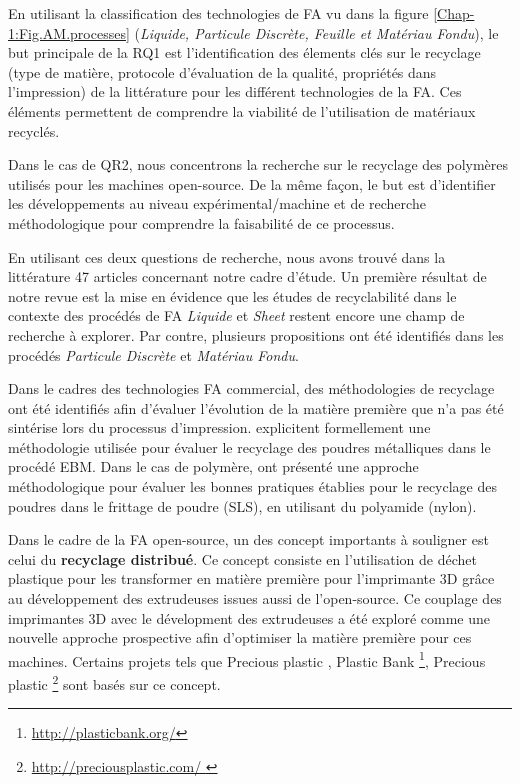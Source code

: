 En utilisant la classification des technologies de FA vu dans la figure \ref{Chap-1:Fig.AM.processes} (\textit{Liquide, Particule Discrète, Feuille et Matériau Fondu}), 
le but principale de la RQ1 est l'identification des élements clés sur le recyclage (type de matière, protocole d'évaluation de la qualité, propriétés dans l'impression) de la littérature pour les différent technologies de la FA.		
Ces éléments permettent de comprendre la viabilité de l'utilisation de matériaux recyclés.

Dans le cas de QR2, nous  concentrons  la recherche sur le recyclage des polymères utilisés pour les machines open-source.
De la même façon, le but est d'identifier les développements au niveau expérimental/machine et de recherche méthodologique pour comprendre la faisabilité de ce processus.


En utilisant ces deux questions de recherche,  nous avons trouvé dans la littérature 47 articles concernant notre cadre d'étude.
Un première résultat de notre revue est la mise en évidence que les études de recyclabilité dans le contexte des procédés de FA \textit{Liquide} et \textit{Sheet} restent encore une champ de recherche à explorer.
Par contre, plusieurs propositions ont été identifiés dans les procédés \textit{Particule Discrète} et \textit{Matériau Fondu}.

Dans le cadres des technologies FA commercial, des méthodologies de recyclage ont été identifiés afin d'évaluer l'évolution de la matière première que n'a pas été sintérise lors du processus d'impression.
\textcite{Raugel2015}  explicitent formellement une méthodologie utilisée pour évaluer le recyclage des poudres métalliques dans le procédé EBM.
Dans le cas de polymère, \textcite{Dotchev2009}  ont présenté une approche méthodologique pour évaluer les bonnes pratiques établies pour le recyclage des poudres dans le frittage de poudre (SLS), en utilisant du polyamide (nylon).



Dans le cadre de la FA open-source, un des concept importants à souligner est celui du \textbf{recyclage distribué}.
Ce concept consiste en l'utilisation de déchet plastique pour les transformer en matière première pour l'imprimante 3D 
grâce au développement des extrudeuses issues aussi de l'open-source.
Ce couplage des imprimantes 3D avec le dévelopment des extrudeuses  a été exploré comme une nouvelle approche prospective afin d'optimiser  la matière première pour ces machines.
Certains projets tels que  Precious plastic \parencite{Hakkens2016}, Plastic Bank \footnote{\hyperlink{http://plasticbank.org/}{http://plasticbank.org/}},  Precious plastic \footnote{\hyperlink{http://preciousplastic.com/ }{http://preciousplastic.com/ }} \parencite{Hakkens2016} sont basés sur ce concept.

